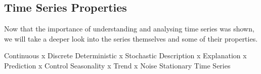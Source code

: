 \documentclass[../main.tex]{subfiles}
\begin{document}
    \subsection{Time Series Properties}
        Now that the importance of understanding and analysing time series was shown, we will take a deeper look into the series themselves and some of their properties. \par

        Continuous x Discrete
        Deterministic x Stochastic
        Description x Explanation x Prediction x Control
        Seasonality x Trend x Noise
        Stationary Time Series
        
\end{document}

